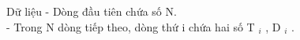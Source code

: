 Dữ liệu
- Dòng đầu tiên chứa số N.   
\\   - Trong N dòng tiếp theo, dòng thứ i chứa hai số T   $_    i   $   , D   $_    i   $   .
